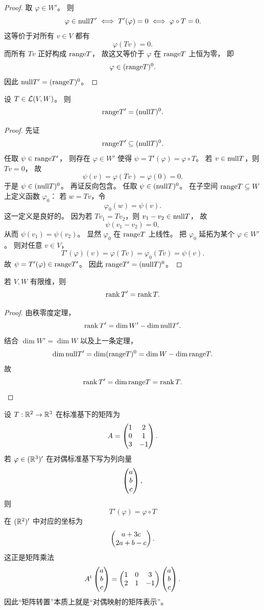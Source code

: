 \begin{proof} 取 $\varphi\in W'$。 则 \[ \varphi\in\mathrm{null} T' \iff T'(\varphi)=0 \iff \varphi\circ T=0. \] 这等价于对所有 $v\in V$ 都有 \[ \varphi(Tv)=0. \] 而所有 $Tv$ 正好构成 $\mathrm{range} T$， 故这又等价于 $\varphi$ 在 $\mathrm{range} T$ 上恒为零， 即 \[ \varphi\in(\mathrm{range} T)^0. \] 因此 $\mathrm{null} T'=(\mathrm{range} T)^0$。 \end{proof}




\begin{theorem} 设 $T\in\mathcal{L}(V,W)$。 则 \[ \mathrm{range} T'=(\mathrm{null} T)^0. \] \end{theorem}




\begin{proof} 先证 \[ \mathrm{range} T'\subseteq(\mathrm{null} T)^0. \] 任取 $\psi\in\mathrm{range} T'$， 则存在 $\varphi\in W'$ 使得 $\psi=T'(\varphi)=\varphi\circ T$。 若 $v\in\mathrm{null} T$，则 $Tv=0$， 故 \[ \psi(v)=\varphi(Tv)=\varphi(0)=0. \] 于是 $\psi\in(\mathrm{null} T)^0$。 再证反向包含。 任取 $\psi\in(\mathrm{null} T)^0$。 在子空间 $\mathrm{range} T\subseteq W$ 上定义函数 $\varphi_0$： 若 $w=Tv$，令 \[ \varphi_0(w)=\psi(v). \] 这一定义是良好的。 因为若 $Tv_1=Tv_2$，则 $v_1-v_2\in\mathrm{null} T$， 故 \[ \psi(v_1-v_2)=0, \] 从而 $\psi(v_1)=\psi(v_2)$。 显然 $\varphi_0$ 在 $\mathrm{range} T$ 上线性。 把 $\varphi_0$ 延拓为某个 $\varphi\in W'$。 则对任意 $v\in V$， \[ T'(\varphi)(v)=\varphi(Tv)=\varphi_0(Tv)=\psi(v). \] 故 $\psi=T'(\varphi)\in\mathrm{range} T'$。 因此 $\mathrm{range} T'=(\mathrm{null} T)^0$。 \end{proof}




\begin{corollary} 若 $V,W$ 有限维，则 \[ \operatorname{rank} T'=\operatorname{rank} T. \] \end{corollary}




\begin{proof} 由秩零度定理， \[ \operatorname{rank} T'=\dim W'-\dim\mathrm{null} T'. \] 结合 $\dim W'=\dim W$ 以及上一条定理， \[ \dim\mathrm{null} T'=\dim(\mathrm{range} T)^0=\dim W-\dim\mathrm{range} T. \] 故 \[ \operatorname{rank} T'=\dim\mathrm{range} T=\operatorname{rank} T. \] \end{proof}




\begin{example} 设 $T:\mathbb{R}^2\to\mathbb{R}^3$ 在标准基下的矩阵为 \[ A=\begin{pmatrix} 1&2\\0&1\\3&-1 \end{pmatrix}. \] 若 $\varphi\in(\mathbb{R}^3)'$ 在对偶标准基下写为列向量 \[ \begin{pmatrix} a\\b\\c \end{pmatrix}, \] 则 \[ T'(\varphi)=\varphi\circ T \] 在 $(\mathbb{R}^2)'$ 中对应的坐标为 \[ \begin{pmatrix} a+3c\\2a+b-c \end{pmatrix}. \] 这正是矩阵乘法 \[ A^{\mathrm t}\begin{pmatrix} a\\b\\c \end{pmatrix} =\begin{pmatrix} 1&0&3\\2&1&-1 \end{pmatrix}\begin{pmatrix} a\\b\\c \end{pmatrix}. \] 因此“矩阵转置”本质上就是“对偶映射的矩阵表示”。 \end{example}




